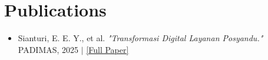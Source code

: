 
\section*{Publications}
\begin{itemize}
  \item Sianturi, E. E. Y., et al. \textit{"Transformasi Digital Layanan Posyandu."} PADIMAS, 2025 $|$ \href{https://jurnal.mdp.ac.id/index.php/padimas/article/view/12206}{\footnotesize [Full Paper]}
\end{itemize}
